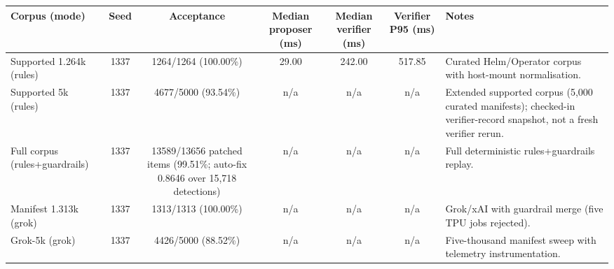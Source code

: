 \begin{tabularx}{\textwidth}{@{}l c c c c c X@{}}
\toprule
\textbf{Corpus (mode)} & \textbf{Seed} & \textbf{Acceptance} & \textbf{Median proposer (ms)} & \textbf{Median verifier (ms)} & \textbf{Verifier P95 (ms)} & \textbf{Notes} \\
\midrule
Supported 1.264k (rules) & 1337 & 1264/1264 (100.00\%) & 29.00 & 242.00 & 517.85 & Curated Helm/Operator corpus with host-mount normalisation. \\
Supported 5k (rules) & 1337 & 4677/5000 (93.54\%) & n/a & n/a & n/a & Extended supported corpus (5,000 curated manifests); checked-in verifier-record snapshot, not a fresh verifier rerun. \\
Full corpus (rules+guardrails) & 1337 & 13589/13656 patched items (99.51\%; auto-fix 0.8646 over 15,718 detections) & n/a & n/a & n/a & Full deterministic rules+guardrails replay. \\
Manifest 1.313k (grok) & 1337 & 1313/1313 (100.00\%) & n/a & n/a & n/a & Grok/xAI with guardrail merge (five TPU jobs rejected). \\
Grok-5k (grok) & 1337 & 4426/5000 (88.52\%) & n/a & n/a & n/a & Five-thousand manifest sweep with telemetry instrumentation. \\
\bottomrule
\end{tabularx}
